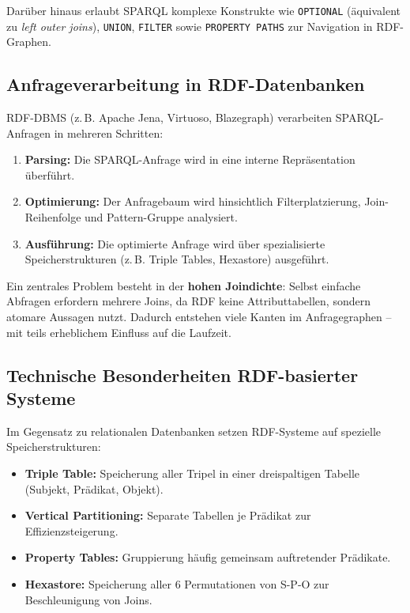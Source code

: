 \documentclass[12pt]{article}
\begin{document}
Darüber hinaus erlaubt SPARQL komplexe Konstrukte wie \texttt{OPTIONAL} (äquivalent zu \textit{left outer joins}), \texttt{UNION}, \texttt{FILTER} sowie \texttt{PROPERTY PATHS} zur Navigation in RDF-Graphen.

\subsection{Anfrageverarbeitung in RDF-Datenbanken}

RDF-DBMS (z.\,B. Apache Jena, Virtuoso, Blazegraph) verarbeiten SPARQL-Anfragen in mehreren Schritten:

\begin{enumerate}
    \item \textbf{Parsing:} Die SPARQL-Anfrage wird in eine interne Repräsentation überführt.
    \item \textbf{Optimierung:} Der Anfragebaum wird hinsichtlich Filterplatzierung, Join-Reihenfolge und Pattern-Gruppe analysiert.
    \item \textbf{Ausführung:} Die optimierte Anfrage wird über spezialisierte Speicherstrukturen (z.\,B. Triple Tables, Hexastore) ausgeführt.
\end{enumerate}

Ein zentrales Problem besteht in der \textbf{hohen Joindichte}: Selbst einfache Abfragen erfordern mehrere Joins, da RDF keine Attributtabellen, sondern atomare Aussagen nutzt. Dadurch entstehen viele Kanten im Anfragegraphen – mit teils erheblichem Einfluss auf die Laufzeit.

\subsection{Technische Besonderheiten RDF-basierter Systeme}

Im Gegensatz zu relationalen Datenbanken setzen RDF-Systeme auf spezielle Speicherstrukturen:
\begin{itemize}
    \item \textbf{Triple Table:} Speicherung aller Tripel in einer dreispaltigen Tabelle (Subjekt, Prädikat, Objekt).
    \item \textbf{Vertical Partitioning:} Separate Tabellen je Prädikat zur Effizienzsteigerung.
    \item \textbf{Property Tables:} Gruppierung häufig gemeinsam auftretender Prädikate.
    \item \textbf{Hexastore:} Speicherung aller 6 Permutationen von S-P-O zur Beschleunigung von Joins.
\end{itemize}
\end{document}
